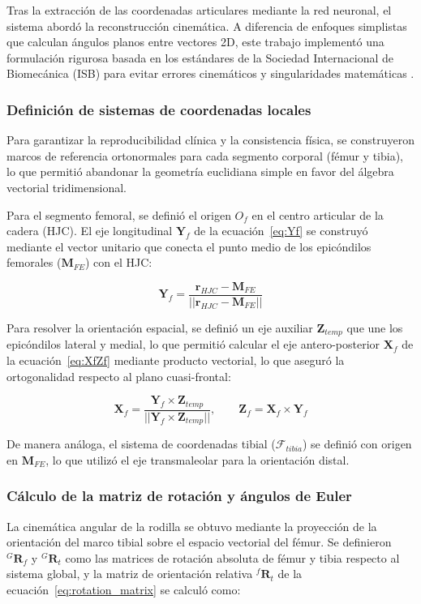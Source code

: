Tras la extracción de las coordenadas articulares mediante la red neuronal, el
sistema abordó la reconstrucción cinemática. A diferencia de enfoques
simplistas que calculan ángulos planos entre vectores 2D, este trabajo
implementó una formulación rigurosa basada en los estándares de la Sociedad
Internacional de Biomecánica (ISB) para evitar errores cinemáticos y
singularidades matemáticas \citep{Wu2002_ISB_Part1}.

\subsubsection{Definición de sistemas de coordenadas locales}
Para garantizar la reproducibilidad clínica y la consistencia física, se
construyeron marcos de referencia ortonormales para cada segmento corporal
(fémur y tibia), lo que permitió abandonar la geometría euclidiana simple en
favor del álgebra vectorial tridimensional.

Para el segmento femoral, se definió el origen $O_f$ en el centro articular de
la cadera (HJC). El eje longitudinal $\mathbf{Y}_f$ de la ecuación~\ref{eq:Yf} se construyó mediante el
vector unitario que conecta el punto medio de los epicóndilos femorales
($\mathbf{M}_{FE}$) con el HJC:

\begin{equation}
  \label{eq:Yf}
  \mathbf{Y}_f = \frac{\mathbf{r}_{HJC} - \mathbf{M}_{FE}}{||\mathbf{r}_{HJC} - \mathbf{M}_{FE}||}
\end{equation}

Para resolver la orientación espacial, se definió un eje auxiliar
$\mathbf{Z}_{temp}$ que une los epicóndilos lateral y medial, lo que permitió
calcular el eje antero-posterior $\mathbf{X}_f$ de la ecuación~\ref{eq:XfZf} mediante producto vectorial, lo que aseguró la ortogonalidad respecto al plano cuasi-frontal:

\begin{equation}
  \label{eq:XfZf}
  \mathbf{X}_f = \frac{\mathbf{Y}_f \times \mathbf{Z}_{temp}}{||\mathbf{Y}_f \times \mathbf{Z}_{temp}||}, \quad \quad \mathbf{Z}_f = \mathbf{X}_f \times \mathbf{Y}_f
\end{equation}

De manera análoga, el sistema de coordenadas tibial ($\mathcal{F}_{tibia}$) se
definió con origen en $\mathbf{M}_{FE}$, lo que utilizó el eje transmaleolar
para la orientación distal.

\subsubsection{Cálculo de la matriz de rotación y ángulos de Euler}
La cinemática angular de la rodilla se obtuvo mediante la proyección de la
orientación del marco tibial sobre el espacio vectorial del fémur. Se
definieron ${}^G\mathbf{R}_f$ y ${}^G\mathbf{R}_t$ como las matrices de
rotación absoluta de fémur y tibia respecto al sistema global, y la matriz de
orientación relativa ${}^f\mathbf{R}_t$ de la ecuación~\ref{eq:rotation_matrix} se calculó como:


